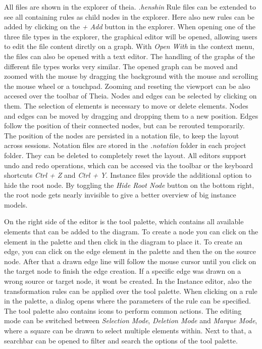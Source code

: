 All files are shown in the explorer of theia. \textit{.henshin} Rule files can be extended to see all containing rules as child nodes in the explorer. Here also new rules can be added by clicking on the \textit{+ Add} button in the explorer. When opening one of the three file types in the explorer, the graphical editor will be opened, allowing users to edit the file content dirctly on a graph. With \textit{Open With} in the context menu, the files can also be opened with a text editor. The handling of the graphs of the different file types works very similar. The opened graph can be moved and zoomed with the mouse by dragging the background with the mouse and scrolling the mouse wheel or a touchpad. Zooming and reseting the viewport can be also accesed over the toolbar of Theia. Nodes and edges can be selected by clicking on them. The selection of elements is necessary to move or delete elements. Nodes and edges can be moved by dragging and dropping them to a new position. Edges follow the position of their connected nodes, but can be rerouted temporarily. The position of the nodes are persisted in a notation file, to keep the layout across sessions. Notation files are stored in the \textit{.notation} folder in each project folder. They can be deleted to completely reset the layout. All editors support undo and redo operations, which can be accesed via the toolbar or the keyboard shortcuts \textit{Ctrl + Z} and \textit{Ctrl + Y}. Instance files provide the additional option to hide the root node. By toggling the \textit{Hide Root Node} button on the bottom right, the root node gets nearly invisible to give a better overview of big instance models.

On the right side of the editor is the tool palette, which contains all available elements that can be added to the diagram. To create a node you can click on the element in the palette and then click in the diagram to place it. To create an edge, you can click on the edge element in the palette and then the on the source node. After that a drawn edge line will follow the mouse cursor until you click on the target node to finish the edge creation. If a specific edge was drawn on a wrong source or target node, it wont be created. In the Instance editor, also the transformation rules can be applied over the tool palette. When clicking on a rule in the palette, a dialog opens where the parameters of the rule can be specified. The tool palette also contains icons to perform common actions. The editing mode can be switched between \textit{Selection Mode}, \textit{Deletion Mode} and \textit{Marque Mode}, where a square can be drawn to select multiple elements within. Next to that, a searchbar can be opened to filter and search the options of the tool palette.

